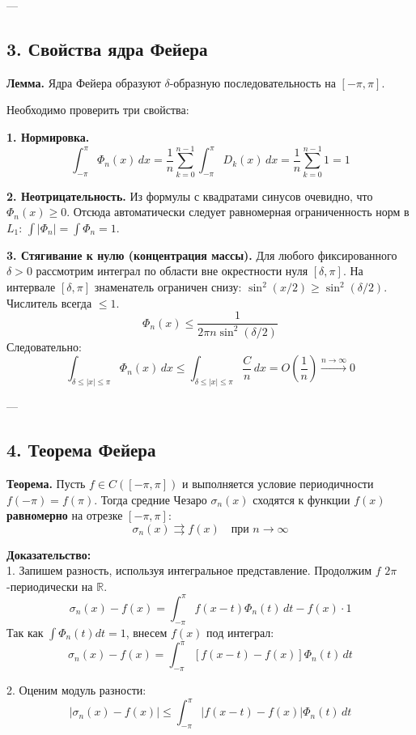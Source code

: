 \documentclass[12pt,a4paper,openany]{book}
\begin{document}
---

\subsection{3. Свойства ядра Фейера}

\textbf{Лемма.} Ядра Фейера образуют $\delta$-образную последовательность на $[-\pi, \pi]$.

Необходимо проверить три свойства:

\textbf{1. Нормировка.}
$$ \int_{-\pi}^{\pi} \Phi_n(x)\,dx = \frac{1}{n} \sum_{k=0}^{n-1} \int_{-\pi}^{\pi} D_k(x)\,dx = \frac{1}{n} \sum_{k=0}^{n-1} 1 = 1 $$

\textbf{2. Неотрицательность.}
Из формулы с квадратами синусов очевидно, что $\Phi_n(x) \ge 0$.
Отсюда автоматически следует равномерная ограниченность норм в $L_1$: $\int |\Phi_n| = \int \Phi_n = 1$.

\textbf{3. Стягивание к нулю (концентрация массы).}
Для любого фиксированного $\delta > 0$ рассмотрим интеграл по области вне окрестности нуля $[\delta, \pi]$.
На интервале $[\delta, \pi]$ знаменатель ограничен снизу: $\sin^2(x/2) \ge \sin^2(\delta/2)$.
Числитель всегда $\le 1$.
$$ \Phi_n(x) \le \frac{1}{2\pi n \sin^2(\delta/2)} $$
Следовательно:
$$ \int_{\delta \le |x| \le \pi} \Phi_n(x)\,dx \le \int_{\delta \le |x| \le \pi} \frac{C}{n}\,dx = O\left(\frac{1}{n}\right) \xrightarrow{n \to \infty} 0 $$

---

\subsection{4. Теорема Фейера}

\textbf{Теорема.} Пусть $f \in C([-\pi, \pi])$ и выполняется условие периодичности $f(-\pi) = f(\pi)$. Тогда средние Чезаро $\sigma_n(x)$ сходятся к функции $f(x)$ \textbf{равномерно} на отрезке $[-\pi, \pi]$:
$$ \sigma_n(x) \rightrightarrows f(x) \quad \text{при } n \to \infty $$

\textbf{Доказательство:} \\
1. Запишем разность, используя интегральное представление. Продолжим $f$ $2\pi$-периодически на $\mathbb{R}$.
$$ \sigma_n(x) - f(x) = \int_{-\pi}^{\pi} f(x-t)\Phi_n(t)\,dt - f(x) \cdot 1 $$
Так как $\int \Phi_n(t)dt = 1$, внесем $f(x)$ под интеграл:
$$ \sigma_n(x) - f(x) = \int_{-\pi}^{\pi} [f(x-t) - f(x)] \Phi_n(t)\,dt $$

2. Оценим модуль разности:
$$ |\sigma_n(x) - f(x)| \le \int_{-\pi}^{\pi} |f(x-t) - f(x)| \Phi_n(t)\,dt $$
\end{document}
